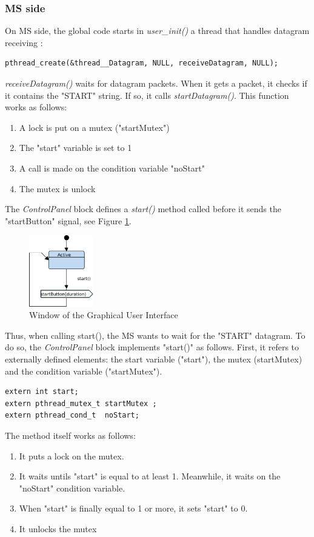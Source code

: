 \documentclass[12pt]{article}
\begin{document}
\subsubsection{MS side}
On MS side, the global code starts in  \textit{user\_init()} a thread that handles datagram receiving :
\begin{lstlisting}
pthread_create(&thread__Datagram, NULL, receiveDatagram, NULL);
\end{lstlisting}
\textit{receiveDatagram()} waits for datagram packets. When it gets a packet, it checks if it contains the "START" string. If so, it calls \textit{startDatagram()}.  This function works as follows:
\begin{enumerate}
\item A lock is put on a mutex ("startMutex")
\item The "start" variable is set to 1
\item A call is made on the condition variable "noStart"
\item The mutex is unlock
\end{enumerate}
The \textit{ControlPanel} block defines a \textit{start()} method called before it sends the "startButton" signal, see Figure \ref{fig:controlpanel}.

\begin{figure}[htbp]
\centering
\includegraphics[width=0.25\textwidth]{figures/controlpanel}
\caption{Window of the Graphical User Interface} \label{fig:controlpanel}
\end{figure}

Thus, when calling start(), the MS wants to wait for the "START" datagram. To do so, the \textit{ControlPanel} block implements "start()" as follows. First, it refers to externally defined elements: the start variable ("start"), the mutex (startMutex) and the condition variable ("startMutex").
\begin{lstlisting}
extern int start;
extern pthread_mutex_t startMutex ;
extern pthread_cond_t  noStart;
\end{lstlisting}
The method itself works as follows:
\begin{enumerate}
\item It puts a lock on the mutex.
\item It waits untils "start" is equal to at least 1. Meanwhile, it waits on the "noStart" condition variable.
\item When "start" is finally equal to 1 or more, it sets "start" to 0.
\item It unlocks the mutex
\end{enumerate}
\end{document}
